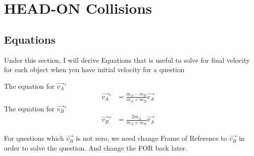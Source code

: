 \section{HEAD-ON Collisions}
\subsection{Equations}
Under this section, I will derive Equations that is useful to solve for final velocity for each object when you have initial velocity for a  question

    The equation for $\vec{v_A}'$
   \begin{align*}
    \vec{v_A}' &= \frac{m_A - m_B}{m_A + m_B}\vec{v_A}
   \end{align*}
   The equation for $\vec{v_B}'$
   \begin{align*}
    \vec{v_B}' &= \frac{2m_A}{m_A + m_B}\vec{v_A}
   \end{align*}

For questions which $\vec{v_B}$ is not zero, we need change Frame of Reference to $\vec{v_B}$ in order to solve the question. And change the FOR back later. 
